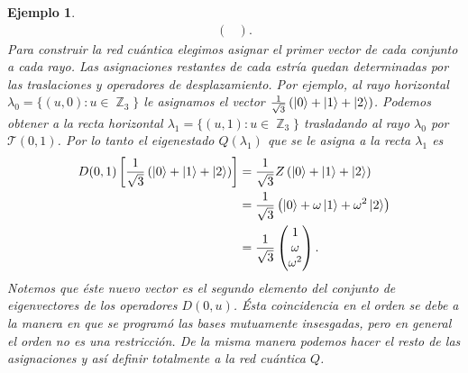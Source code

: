 \documentclass[a4paper]{report}
\DeclareMathOperator{\Z}{\mathbb{Z}}
\newtheorem{example}{Ejemplo}
\begin{document}
\begin{example}
\begin{align}
\begin{pmatrix}
      \end{pmatrix}.
    \end{align}
    Para construir la red cuántica elegimos asignar el
    primer vector de cada conjunto a cada rayo. Las
    asignaciones restantes de cada estría quedan
    determinadas por las traslaciones y operadores de
    desplazamiento. Por ejemplo, al rayo horizontal
    $\lambda_0 = \{(u,0) : u \in \Z_3\}$ le asignamos el
    vector $\frac{1}{\sqrt{3}} \left( \ket 0 + \ket 1 + \ket
    2 \right)$. Podemos obtener a la recta horizontal
    $\lambda_1 = \{(u,1) : u \in \Z_3\}$ trasladando al
    rayo $\lambda_0$ por $\mathcal T(0,1)$. Por lo tanto el
    eigenestado $Q(\lambda_1)$ que se le asigna a la recta
    $\lambda_1$ es
    \begin{align}
      D(0,1) \left[ \frac{1}{\sqrt{3}} \left( \ket 0 + \ket
      1 + \ket 2\right) \right]
      &= \frac{1}{\sqrt{3}} Z \left( \ket 0 + \ket 1 + \ket
      2\right) \\
      &= \frac{1}{\sqrt{3}} \left( \ket 0 + \omega
      \ket 1 + \omega^2 \ket 2\right) \\
      &= \frac{1}{\sqrt{3}} \begin{pmatrix} 1 \\ \omega \\
      \omega^2 \end{pmatrix}.
    \end{align}
    Notemos que éste nuevo vector es el segundo elemento del
    conjunto de eigenvectores de los operadores $D(0,u)$.
    Ésta coincidencia en el orden se debe a la manera en que
    se programó las bases mutuamente insesgadas, pero en
    general el orden no es una restricción. De la misma
    manera podemos hacer el resto de las asignaciones y así
    definir totalmente a la red cuántica $Q$.


\end{example}
\end{document}
